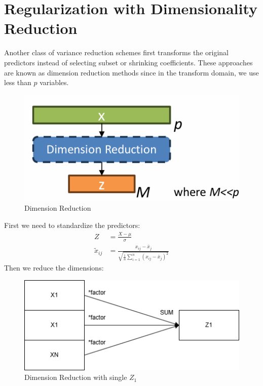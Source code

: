 \documentclass[../Main.tex]{subfiles}
\begin{document}
\newpage
\section{Regularization with Dimensionality Reduction}
Another class of variance reduction schemes first transforms the original predictors
instead of selecting subset or shrinking coefficients.
These approaches are known as dimension reduction methods since 
in the transform domain, we use less than \(p\) variables.

\begin{figure}[H]
    \centering
    \includegraphics[width=0.5\linewidth]{Images/dim-reduction.png}
    \caption{Dimension Reduction}
\end{figure}

First we need to standardize the predictors:
\begin{equation*}
    \begin{split}
        Z &= \frac{X-\mu}{\sigma} \\
        \tilde{x}_{ij} &= \frac{x_{ij} - \bar{x}_j}{\sqrt{\frac{1}{n}\sum_{i=1}^{n} (x_{ij} - \bar{x}_j)^2}}
    \end{split}
\end{equation*}
Then we reduce the dimensions:

\begin{figure}[H]
    \centering
    \includegraphics[width=0.5\linewidth]{Images/dim-reduction-schema.png}
    \caption{Dimension Reduction with single \(Z_1\)}
\end{figure}
\end{document}
